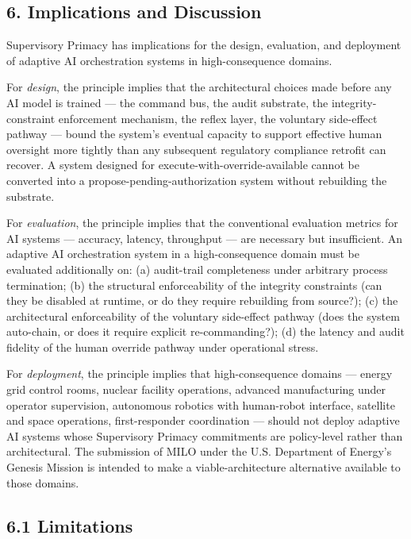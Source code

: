 \subsection{6. Implications and
Discussion}\label{implications-and-discussion}

Supervisory Primacy has implications for the design, evaluation, and
deployment of adaptive AI orchestration systems in high-consequence
domains.

For \emph{design}, the principle implies that the architectural choices
made before any AI model is trained --- the command bus, the audit
substrate, the integrity-constraint enforcement mechanism, the reflex
layer, the voluntary side-effect pathway --- bound the system's eventual
capacity to support effective human oversight more tightly than any
subsequent regulatory compliance retrofit can recover. A system designed
for execute-with-override-available cannot be converted into a
propose-pending-authorization system without rebuilding the substrate.

For \emph{evaluation}, the principle implies that the conventional
evaluation metrics for AI systems --- accuracy, latency, throughput ---
are necessary but insufficient. An adaptive AI orchestration system in a
high-consequence domain must be evaluated additionally on: (a)
audit-trail completeness under arbitrary process termination; (b) the
structural enforceability of the integrity constraints (can they be
disabled at runtime, or do they require rebuilding from source?); (c)
the architectural enforceability of the voluntary side-effect pathway
(does the system auto-chain, or does it require explicit
re-commanding?); (d) the latency and audit fidelity of the human
override pathway under operational stress.

For \emph{deployment}, the principle implies that high-consequence
domains --- energy grid control rooms, nuclear facility operations,
advanced manufacturing under operator supervision, autonomous robotics
with human-robot interface, satellite and space operations,
first-responder coordination --- should not deploy adaptive AI systems
whose Supervisory Primacy commitments are policy-level rather than
architectural. The submission of MILO under the U.S. Department of
Energy's Genesis Mission \cite{ref4} is intended to make a
viable-architecture alternative available to those domains.

\subsection{6.1 Limitations}\label{limitations}

